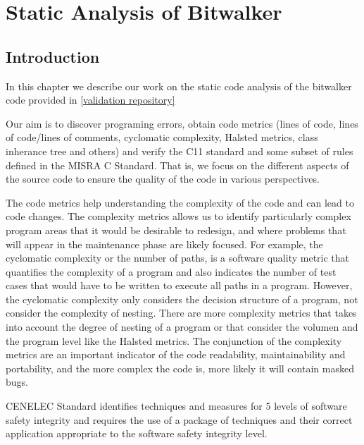 
\chapter{Static Analysis of Bitwalker}
\label{sec:static-analysis}

\section{Introduction}
In this chapter we describe our work on the static code analysis of the bitwalker code provided in \href{https://github.com/openETCS/validation/tree/master/Artifacts/Subset-026-7_XML/Subset026_7/Bitwalker}{[validation repository]}

Our aim is to discover programing errors, obtain code metrics (lines of code, lines of code/lines of comments, cyclomatic complexity, Halsted metrics, class inherance tree and others) and verify the C11 standard and some subset of rules defined in the MISRA C Standard. That is, we focus on the different aspects of the source code to ensure the quality of the code in various perspectives.

The code metrics help understanding the complexity of the code and can lead to code changes. The complexity metrics allows us to identify particularly complex program areas that it would be desirable to redesign, and where problems that will appear in the maintenance phase are likely focused. For example, the cyclomatic complexity or the number of paths, is a software quality metric that quantifies the complexity of a program and also indicates the number of test cases that would have to be written to execute all paths in a program. However, the cyclomatic complexity only considers the decision structure of a program, not consider the complexity of nesting. There are more complexity metrics that takes into account the degree of nesting of a program or that consider the volumen and the program level like the Halsted metrics. The conjunction of the complexity metrics are an important indicator of the code readability, maintainability and portability, and the more complex the code is, more likely it will contain masked bugs.

CENELEC Standard identifies techniques and measures for 5 levels of software safety integrity and requires the use of a package of techniques and their correct
application appropriate to the software safety integrity level.

